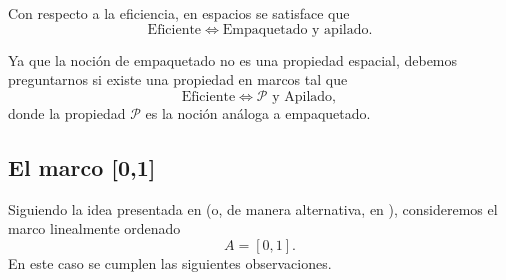 \documentclass[12pt]{article}
\begin{document}
Con respecto a la eficiencia, en espacios se satisface que 
\[
\text{Eficiente}\iff \text{Empaquetado y apilado}.
\]

Ya que la noción de empaquetado no es una propiedad espacial, debemos preguntarnos si existe una propiedad en marcos tal que
\[
\text{Eficiente}\iff \mathcal{P}\text{ y Apilado},
\]
donde la propiedad $\mathcal{P}$ es la noción análoga a empaquetado.

\subsection{El marco [0,1]}

Siguiendo la idea presentada en \cite{simmons2006regularity} (o, de manera alternativa, en \cite{simmons2004vietoris}), consideremos el marco linealmente ordenado 
\[
A=[0,1].
\] 
En este caso se cumplen las siguientes observaciones.
\end{document}
